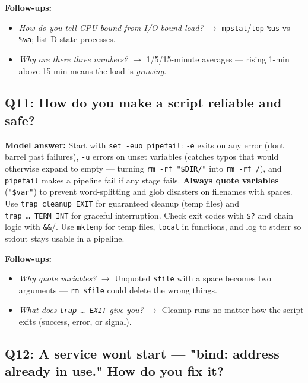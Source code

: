 \documentclass[11pt]{article}
\providecommand{\tightlist}{\setlength{\itemsep}{1pt}\setlength{\parskip}{0pt}}
\begin{document}
\textbf{Follow-ups:}

\begin{itemize}
\tightlist
\item
  \emph{How do you tell CPU-bound from I/O-bound load?} \(\rightarrow\) \texttt{mpstat}/\texttt{top} \texttt{\%us} vs \texttt{\%wa}; list D-state processes.
\item
  \emph{Why are there three numbers?} \(\rightarrow\) 1/5/15-minute averages --- rising 1-min above 15-min means the load is \emph{growing}.
\end{itemize}

\subsection{Q11: How do you make a script reliable and safe?}\label{q11-how-do-you-make-a-script-reliable-and-safe}

\textbf{Model answer:} Start with \texttt{set\ -euo\ pipefail}: \texttt{-e} exits on any error (don\textquotesingle t barrel past failures), \texttt{-u} errors on unset variables (catches typos that would otherwise expand to empty --- turning \texttt{rm\ -rf\ "\$DIR/"} into \texttt{rm\ -rf\ /}), and \texttt{pipefail} makes a pipeline fail if any stage fails. \textbf{Always quote variables} (\texttt{"\$var"}) to prevent word-splitting and glob disasters on filenames with spaces. Use \texttt{trap\ \textquotesingle{}cleanup\textquotesingle{}\ EXIT} for guaranteed cleanup (temp files) and \texttt{trap\ …\ TERM\ INT} for graceful interruption. Check exit codes with \texttt{\$?} and chain logic with \texttt{\&\&}/\texttt{\textbar{}\textbar{}}. Use \texttt{mktemp} for temp files, \texttt{local} in functions, and log to stderr so stdout stays usable in a pipeline.

\textbf{Follow-ups:}

\begin{itemize}
\tightlist
\item
  \emph{Why quote variables?} \(\rightarrow\) Unquoted \texttt{\$file} with a space becomes two arguments --- \texttt{rm\ \$file} could delete the wrong things.
\item
  \emph{What does \texttt{trap\ …\ EXIT} give you?} \(\rightarrow\) Cleanup runs no matter how the script exits (success, error, or signal).
\end{itemize}

\subsection{Q12: A service won\textquotesingle t start --- "bind: address already in use." How do you fix it?}\label{q12-a-service-wont-start--bind-address-already-in-use-how-do-you-fix-it}
\end{document}
